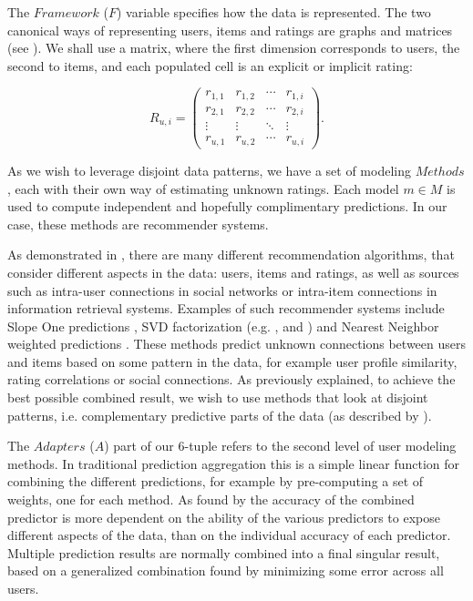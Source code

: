 The $Framework$ ($F$) variable specifies how the data is represented.
The two canonical ways of representing users, items and ratings are graphs and matrices 
(see \cite{Mirza2003}).
We shall use a matrix, where the first dimension corresponds to users, the second to items, and each populated cell is an explicit or implicit rating:

\begin{equation*}
 R_{u,i} =
 \begin{pmatrix}
  r_{1,1} & r_{1,2} & \cdots & r_{1,i} \\
  r_{2,1} & r_{2,2} & \cdots & r_{2,i} \\
  \vdots  & \vdots  & \ddots & \vdots  \\
  r_{u,1} & r_{u,2} & \cdots & r_{u,i}
 \end{pmatrix}.
\end{equation*}

As we wish to leverage disjoint data patterns, we have a set of modeling $Methods$, 
each with their own way of estimating unknown ratings. 
Each model $m \in M$ is used to compute independent and hopefully complimentary predictions.
In our case, these methods are recommender systems.

As demonstrated in 
\cite{Adomavicius2005, Pazzani2007, Schafer2007, Segaran2007},
there are many different recommendation algorithms,
that consider different aspects in the data: users, items and ratings, as well as 
sources such as intra-user connections in social networks or intra-item connections in information retrieval systems.
Examples of such recommender systems include Slope One predictions \cite{Lemire2005}, 
SVD factorization (e.g. \cite[p5]{Billsus}, \cite{Sun2005} and \cite{Bell2007}) and 
Nearest Neighbor weighted predictions \cite[p11]{Segaran2007}.
These methods predict unknown connections between users and items based on some pattern in the data,
for example user profile similarity, rating correlations or social connections.
As previously explained, to achieve the best possible combined result, we wish to use methods that look at disjoint patterns, 
i.e. complementary predictive parts of the data
(as described by \cite[p1]{Bell2007b}).

The $Adapters$ ($A$) part of our 6-tuple refers to the second level of user modeling methods.
In traditional prediction aggregation this is a simple linear function for combining the different predictions,
for example by pre-computing a set of weights, one for each method.
As found by \cite[p6]{Bell2007} the accuracy of the combined predictor is more dependent on the 
ability of the various predictors to expose different aspects of the data, than on 
the individual accuracy of each predictor.
Multiple prediction results are normally combined into a final singular result,
based on a generalized combination found by minimizing some error across all users.

